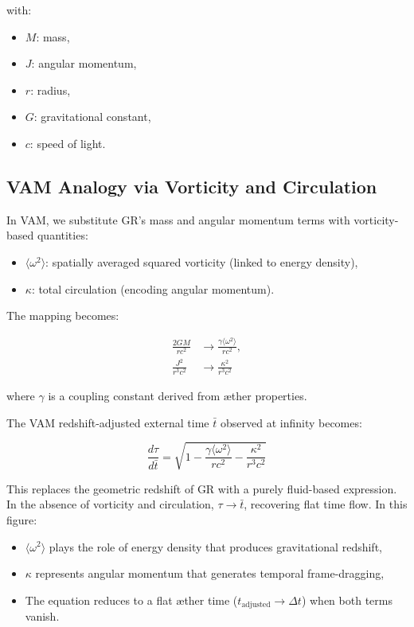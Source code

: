 \documentclass[preprint]{revtex4-2}
\begin{document}
\noindent with:
\begin{itemize}
    \item \( M \): mass,
    \item \( J \): angular momentum,
    \item \( r \): radius,
    \item \( G \): gravitational constant,
    \item \( c \): speed of light.
\end{itemize}

\subsection{VAM Analogy via Vorticity and Circulation}

In VAM, we substitute GR's mass and angular momentum terms with vorticity-based quantities:

\begin{itemize}
    \item \( \langle \omega^2 \rangle \): spatially averaged squared vorticity (linked to energy density),
    \item \( \kappa \): total circulation (encoding angular momentum).
\end{itemize}

The mapping becomes:

\begin{equation}
    \begin{aligned}
        \frac{2GM}{rc^2} &\rightarrow \frac{\gamma \langle \omega^2 \rangle}{r c^2}, \\
        \frac{J^2}{r^3 c^2} &\rightarrow \frac{\kappa^2}{r^3 c^2}
    \end{aligned}
    \label{eq:Kerr_replacements}
\end{equation}

\noindent where \( \gamma \) is a coupling constant derived from æther properties.

The VAM redshift-adjusted external time \( \bar{t} \) observed at infinity becomes:

\begin{equation}
    \boxed{
        \frac{d\tau}{d\bar{t}} = \sqrt{1 - \frac{\gamma \langle \omega^2 \rangle}{r c^2} - \frac{\kappa^2}{r^3 c^2}}
    }
    \label{eq:Kerr_time_dilation_ae}
\end{equation}

This replaces the geometric redshift of GR with a purely fluid-based expression. In the absence of vorticity and circulation, \( \tau \to \bar{t} \), recovering flat time flow. In this figure:
\begin{itemize}
    \item $\langle \omega^2 \rangle$ plays the role of energy density that produces gravitational redshift,
    \item $\kappa$ represents angular momentum that generates temporal frame-dragging,
    \item The equation reduces to a flat æther time ($t_\text{adjusted} \to \Delta t$) when both terms vanish.

\end{itemize}
\end{document}

